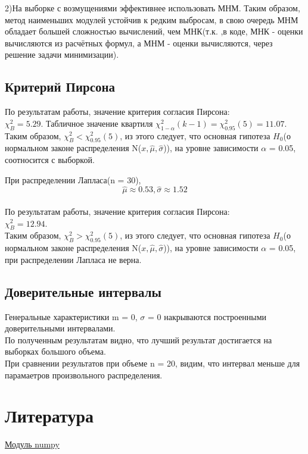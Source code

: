 \documentclass[a4]{article}
\begin{document}
		2)На выборке с возмущениями эффективнее использовать МНМ. Таким образом, метод наименьших модулей устойчив к редким выбросам, в свою очередь МНМ обладает большей сложностью вычислений, чем МНК(т.к. ,в коде, МНК - оценки вычисляются из расчётных формул, а МНМ - оценки вычисляются, через решение задачи минимизации).
		
		
		\subsection{Критерий Пирсона}
			По результатам работы, значение критерия согласия Пирсона:\\
			$\chi^2_B = 5.29$. Табличное значение квартиля $\chi^2_{1 - \alpha}(k - 1) = \chi^2_{0.95}(5) = 11.07$.\\
			
			Таким образом, $\chi^2_B < \chi^2_{0.95}(5)$, из этого следует, что основная гипотеза $H_0$(о нормальном законе распределения N($x, \hat{\mu}, \hat{\sigma}$)), на уровне зависимости $\alpha$ = 0.05, соотносится с выборкой.
			
			При распределении Лапласа(n = 30), $$\hat{\mu} \approx 0.53, \hat{\sigma} \approx 1.52$$\\
			По результатам работы, значение критерия согласия Пирсона:\\
			$\chi^2_B = 12.94$.\\
			Таким образом, $\chi^2_B > \chi^2_{0.95}(5)$, из этого следует, что основная гипотеза $H_0$(о нормальном законе распределения N($x, \hat{\mu}, \hat{\sigma}$)), на уровне зависимости $\alpha$ = 0.05, при распределении Лапласа не верна.
		
		\subsection{Доверительные интервалы}
			Генеральные характеристики m = 0, $\sigma$ = 0 накрываются построенными доверительными интервалами.\\
			
			По полученным результатам видно, что лучший результат достигается на выборках большого объема.\\
			При сравнении результатов при объеме n = 20, видим, что интервал меньше для парамаетров произвольного распределения.
	\section{Литература}
	
	\href{https://physics.susu.ru/vorontsov/language/numpy.html}{Модуль numpy}\\
	
\end{document}
